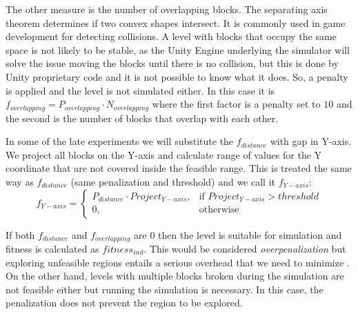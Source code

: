 \documentclass[sigconf]{acmart}
\begin{document}


The other measure is the number of overlapping blocks. The separating axis 
theorem \cite{ericson2004real} determines if two convex shapes intersect. It is 
commonly used in game development for detecting collisions. A level with blocks 
that occupy the same space is not likely to be stable, as the Unity
Engine underlying the simulator will solve the issue moving the blocks until 
there is no collision, but this is done by Unity proprietary code and it is not 
possible to know what it does.
So, a penalty is applied and the level is not simulated either. 
In this case it is $f_{overlapping} = P_{overlapping} \cdot N_{overlapping}$ 
where the first factor is a penalty set to $10$ and the second is the number of 
blocks that overlap with each other.

In some of the late experiments we will substitute the $f_{distance}$ with gap 
in Y-axis.
We project all blocks on the Y-axis and calculate range of values for the Y 
coordinate
that are not covered inside the feasible range. This is treated the same way as 
$f_{distance}$
(same penalization and threshold) and we call it $f_{Y-axis}$:
$$f_{Y-axis} = 
\begin{cases}
P_{distance}\cdot Project_{Y-axis}, & \text{if } Project_{Y-axis} > threshold\\
0, & \text{otherwise}
\end{cases}
$$

If both $f_{distance}$ and $f_{overlapping}$ are $0$ then the level is suitable 
for simulation and fitness is calculated as $fitness_{ind}$. This would be 
considered \textit{overpenalization} but exploring unfeasible regions entails a 
serious overhead that we need to minimize \cite{runarsson2003evolutionary}. 
On the other hand, levels with 
multiple blocks broken during the simulation are not feasible either but 
running the simulation is necessary. In this case, the penalization does not 
prevent the region to be explored.
\end{document}
